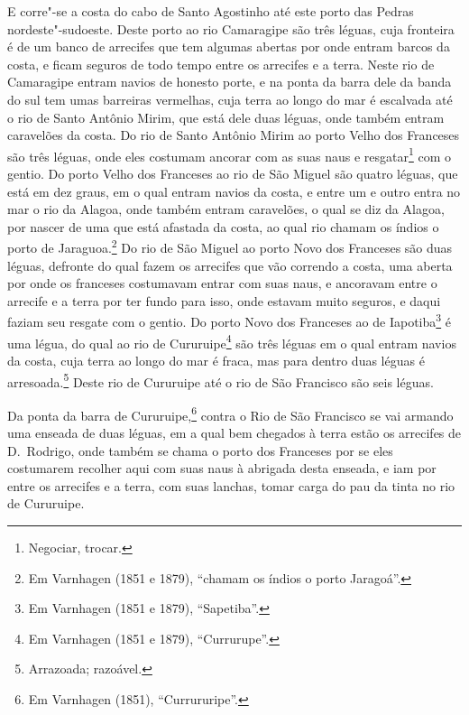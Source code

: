 \begin{linenumbers}
E corre"-se a costa do cabo de Santo Agostinho até este porto das Pedras nordeste"-sudoeste.
Deste porto ao rio Camaragipe são três léguas, cuja fronteira é de um banco de arrecifes
que tem algumas abertas por onde entram barcos da costa, e ficam seguros de todo tempo
entre os arrecifes e a terra. Neste rio de Camaragipe entram navios de honesto porte, e na
ponta da barra dele da banda do sul tem umas barreiras vermelhas, cuja terra ao longo do
mar é escalvada até o rio de Santo Antônio Mirim, que está dele duas léguas, onde também
entram caravelões da costa. Do rio de Santo Antônio Mirim ao porto Velho dos Franceses são
três léguas, onde eles costumam ancorar com as suas naus e resgatar\footnote{ Negociar,
trocar.} com o gentio. Do porto Velho dos Franceses ao rio de São Miguel são quatro
léguas, que está em dez graus, em o qual entram navios da costa, e entre um e outro entra
no mar o rio da Alagoa, onde também entram caravelões, o qual se diz da Alagoa, por nascer
de uma que está afastada da costa, ao qual rio chamam os índios o porto de
Jaraguoa.\footnote{ Em Varnhagen (1851 e 1879), ``chamam os índios o porto Jaragoá''.} Do
rio de São Miguel ao porto Novo dos Franceses são duas léguas, defronte do qual fazem os
arrecifes que vão correndo a costa, uma aberta por onde os franceses costumavam entrar com
suas naus, e ancoravam entre o arrecife e a terra por ter fundo para isso, onde estavam
muito seguros, e daqui faziam seu resgate com o gentio. Do porto Novo dos Franceses ao de
Iapotiba\footnote{ Em Varnhagen (1851 e 1879), ``Sapetiba''.} é uma légua, do qual ao rio
de Cururuipe\footnote{ Em Varnhagen (1851 e 1879), ``Currurupe''.} são três léguas em o
qual entram navios da costa, cuja terra ao longo do mar é fraca, mas para dentro duas
léguas é arresoada.\footnote{ Arrazoada; razoável.} Deste rio de Cururuipe até o rio de
São Francisco são seis léguas.

Da ponta da barra de Cururuipe,\footnote{ Em Varnhagen (1851), ``Currururipe''.} contra o
Rio de São Francisco se vai armando uma enseada de duas léguas, em a qual bem chegados à
terra estão os arrecifes de D.~Rodrigo, onde também se chama o porto dos Franceses por se
eles costumarem recolher aqui com suas naus à abrigada desta enseada, e iam por entre os
arrecifes e a terra, com suas lanchas, tomar carga do pau da tinta no rio de Cururuipe.


\end{linenumbers}
